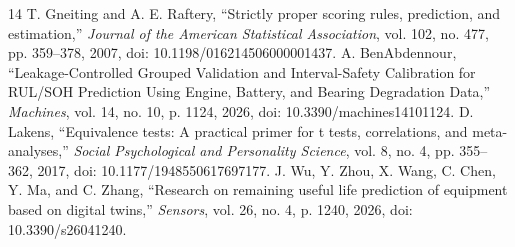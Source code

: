 \documentclass[12pt,a4paper]{article}
\begin{document}
\begin{thebibliography}{14}
 T. Gneiting and A. E. Raftery, ``Strictly proper scoring rules, prediction, and estimation,'' \textit{Journal of the American Statistical Association}, vol. 102, no. 477, pp. 359--378, 2007, doi: 10.1198/016214506000001437.
 A. BenAbdennour, ``Leakage-Controlled Grouped Validation and Interval-Safety Calibration for RUL/SOH Prediction Using Engine, Battery, and Bearing Degradation Data,'' \textit{Machines}, vol. 14, no. 10, p. 1124, 2026, doi: 10.3390/machines14101124.
 D. Lakens, ``Equivalence tests: A practical primer for t tests, correlations, and meta-analyses,'' \textit{Social Psychological and Personality Science}, vol. 8, no. 4, pp. 355--362, 2017, doi: 10.1177/1948550617697177.
 J. Wu, Y. Zhou, X. Wang, C. Chen, Y. Ma, and C. Zhang, ``Research on remaining useful life prediction of equipment based on digital twins,'' \textit{Sensors}, vol. 26, no. 4, p. 1240, 2026, doi: 10.3390/s26041240.
\end{thebibliography}
\end{document}
